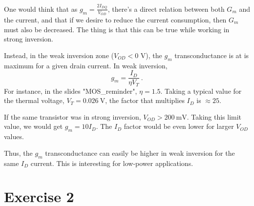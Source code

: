 One would think that as $g_m = \frac{2 I_{DQ}}{V_{OD}}$, there's a direct relation between both $G_m$ and the current, and that if we desire to reduce the current consumption, then $G_m$ must also be decreased. The thing is that this can be true while working in strong inversion. 

Instead, in the weak inversion zone ($V_{OD} < 0$ V), the $g_m$ transconductance is at is maximum for a given drain current. In weak inversion,
\begin{equation}
   g_m  = \frac{I_D}{\eta V_T} \ .
\end{equation}
For instance, in the slides "MOS\_reminder", $\eta = 1.5$. Taking a typical value for the thermal voltage, $V_T = \SI{0.026}{\V}$, the factor that multiplies $I_D$ is $\approx 25$. 

If the same transistor was in strong inversion, $V_{OD} > \SI{200}{\mV}$. Taking this limit value, we would get $g_m = 10 I_{D}$. The $I_D$ factor would be even lower for larger $V_{OD}$ values.

Thus, the $g_m$ transconductance can easily be higher in weak inversion for the same $I_D$ current. This is interesting for low-power applications.




\clearpage
\section{Exercise 2}


